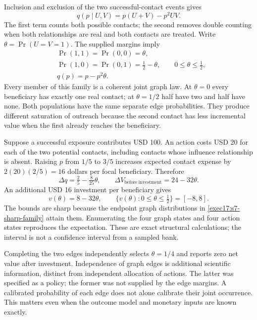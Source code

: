 Inclusion and exclusion of the two successful-contact events gives
\begin{equation}
 q(p\mid U,V)=p(U+V)-p^2UV.
 \label{exec17:s7-exposure}
\end{equation}
The first term counts both possible contacts; the second removes double counting
when both relationships are real and both contacts are treated. Write
$\theta=\Pr(U=V=1)$. The supplied margins imply
\begin{equation}
 \begin{split}
  &\Pr(1,1)=\Pr(0,0)=\theta,\\
  &\Pr(1,0)=\Pr(0,1)=\tfrac12-\theta,
  \qquad 0\leq\theta\leq\tfrac12,\\
  &q(p)=p-p^2\theta.
 \end{split}
 \label{exec17:s7-sharp-family}
\end{equation}
Every member of this family is a coherent joint graph law. At $\theta=0$ every
beneficiary has exactly one real contact; at $\theta=1/2$ half have two and half
have none. Both populations have the same separate edge probabilities. They
produce different saturation of outreach because the second contact has less
incremental value when the first already reaches the beneficiary.

Suppose a successful exposure contributes USD 100. An action costs USD 20
for each of the two potential contacts, including contacts whose influence
relationship is absent. Raising $p$ from $1/5$ to $3/5$ increases expected contact
expense by $2(20)(2/5)=16$ dollars per focal beneficiary. Therefore
\begin{equation}
 \Delta q=\tfrac25-\tfrac8{25}\theta,
 \qquad \Delta V_{\mathrm{before\ investment}}=24-32\theta.
 \label{exec17:s7-graph-value}
\end{equation}
An additional USD 16 investment per beneficiary gives
\begin{equation}
 v(\theta)=8-32\theta,\qquad
 \{v(\theta):0\leq\theta\leq\tfrac12\}=[-8,8].
 \label{exec17:s7-graph-set}
\end{equation}
The bounds are sharp because the endpoint graph distributions in
\eqref{exec17:s7-sharp-family} attain them. Enumerating the four graph states
and four action states reproduces the expectation. These are exact structural
calculations; the interval is not a confidence interval from a sampled bank.
\citep{exec17_s7_math}

Completing the two edges independently selects $\theta=1/4$ and reports zero
net value after investment. Independence of graph edges is additional scientific
information, distinct from independent allocation of actions. The latter was
specified as a policy; the former was not supplied by the edge margins. A
calibrated probability of each edge does not alone calibrate their joint
occurrence. This matters even when the outcome model and monetary inputs are
known exactly.

